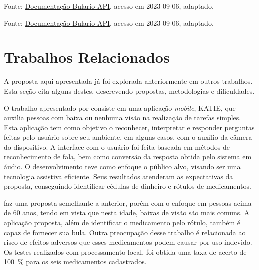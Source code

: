 \begin{lstfloat}[p]
    \centering
    
    \caption*{Fonte: \href{https://bula.vercel.app/docs}{Documentação Bulario \ac{API}}, acesso em 2023-09-06, adaptado.}
\end{lstfloat}

\begin{lstfloat}[p]
    \centering
    
    \caption*{Fonte: \href{https://bula.vercel.app/docs}{Documentação Bulario \ac{API}}, acesso em 2023-09-06, adaptado.}
\end{lstfloat}


\section{Trabalhos Relacionados}

A proposta aqui apresentada já foi explorada anteriormente em outros trabalhos.
Esta seção cita alguns destes, descrevendo propostas, metodologias e dificuldades.

O trabalho apresentado por \citeauthor{steffenon2020katie} \cite{steffenon2020katie} consiste em uma aplicação \textit{mobile}, KATIE, que auxilia pessoas com baixa ou nenhuma visão na realização de tarefas simples.
Esta aplicação tem como objetivo o reconhecer, interpretar e responder perguntas feitas pelo usuário sobre seu ambiente, em alguns casos, com o auxílio da câmera do dispositivo.
A interface com o usuário foi feita baseada em métodos de reconhecimento de fala, bem como conversão da resposta obtida pelo sistema em áudio.
O desenvolvimento teve como enfoque o público alvo, visando ser uma tecnologia assistiva eficiente.
Seus resultados atenderam as expectativas da proposta, conseguindo identificar cédulas de dinheiro e rótulos de medicamentos.

\citeauthor{gadenz2019desenvolvimento} \cite{gadenz2019desenvolvimento} faz uma proposta semelhante a anterior, porém com o enfoque em pessoas acima de 60 anos, tendo em vista que nesta idade, baixas de visão são mais comuns.
A aplicação proposta, além de identificar o medicamento pelo rótulo, também é capaz de fornecer sua bula.
Outra preocupação desse trabalho é relacionada ao risco de efeitos adversos que esses medicamentos podem causar por uso indevido.
Os testes realizados com processamento local, foi obtida uma taxa de acerto de \SI{100}{\percent} para os seis medicamentos cadastrados.

